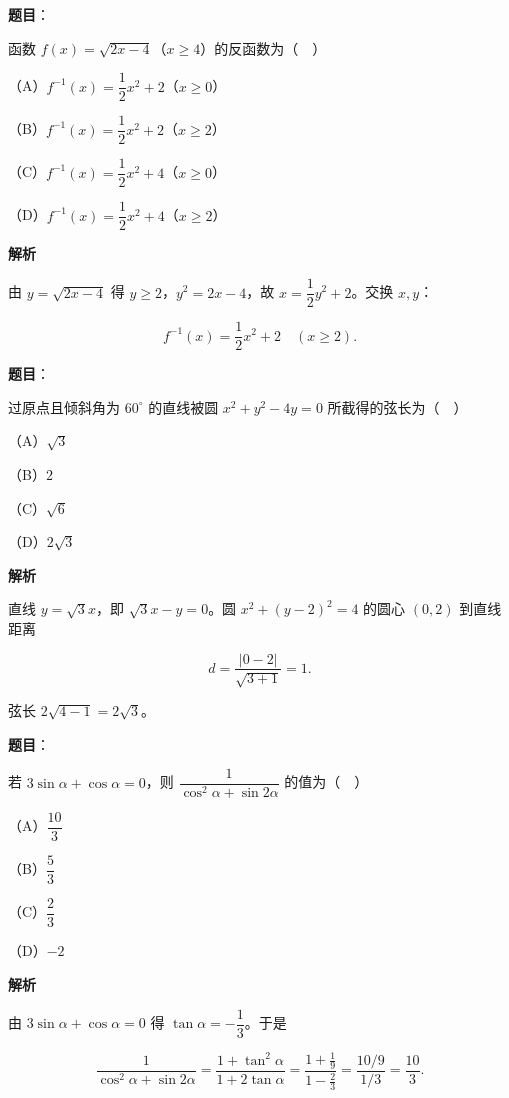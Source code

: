 \begin{answer}

\textbf{题目}：

函数 $f(x)=\sqrt{2x-4}$（$x\geqslant4$）的反函数为（　）

（A）$f^{-1}(x)=\dfrac12x^2+2$（$x\geqslant0$）

（B）$f^{-1}(x)=\dfrac12x^2+2$（$x\geqslant2$）

（C）$f^{-1}(x)=\dfrac12x^2+4$（$x\geqslant0$）

（D）$f^{-1}(x)=\dfrac12x^2+4$（$x\geqslant2$）

\textbf{解析}

由 $y=\sqrt{2x-4}$ 得 $y\geqslant2$，$y^2=2x-4$，故 $x=\dfrac12y^2+2$。交换 $x,y$：

\nopagebreak[4]
\[f^{-1}(x)=\frac12x^2+2\quad(x\geqslant2).\]


\end{answer}
\begin{answer}

\textbf{题目}：

过原点且倾斜角为 $60^\circ$ 的直线被圆 $x^2+y^2-4y=0$ 所截得的弦长为（　）

（A）$\sqrt3$

（B）$2$

（C）$\sqrt6$

（D）$2\sqrt3$

\textbf{解析}

直线 $y=\sqrt3x$，即 $\sqrt3x-y=0$。圆 $x^2+(y-2)^2=4$ 的圆心 $(0,2)$ 到直线距离

\nopagebreak[4]
\[d=\frac{|0-2|}{\sqrt{3+1}}=1.\]

弦长 $2\sqrt{4-1}=2\sqrt3$。


\end{answer}
\begin{answer}

\textbf{题目}：

若 $3\sin\alpha+\cos\alpha=0$，则 $\dfrac1{\cos^2\alpha+\sin2\alpha}$ 的值为（　）

（A）$\dfrac{10}3$

（B）$\dfrac53$

（C）$\dfrac23$

（D）$-2$

\textbf{解析}

由 $3\sin\alpha+\cos\alpha=0$ 得 $\tan\alpha=-\dfrac13$。于是

\nopagebreak[4]
\[\frac1{\cos^2\alpha+\sin2\alpha}
=\frac{1+\tan^2\alpha}{1+2\tan\alpha}
=\frac{1+\frac19}{1-\frac23}
=\frac{10/9}{1/3}=\frac{10}3.\]


\end{answer}
